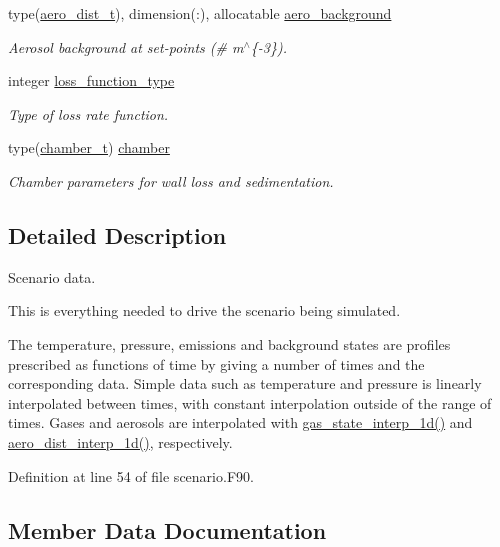 \begin{DoxyCompactItemize}
type(\mbox{\hyperlink{structpmc__aero__dist_1_1aero__dist__t}{aero\+\_\+dist\+\_\+t}}), dimension(\+:), allocatable \mbox{\hyperlink{structpmc__scenario_1_1scenario__t_a3baa3f5d6161da8ee9f83f60778b8aea}{aero\+\_\+background}}
\begin{DoxyCompactList}\small\item\em Aerosol background at set-\/points (\# m$^\wedge$\{-\/3\}). \end{DoxyCompactList}\item 
integer \mbox{\hyperlink{structpmc__scenario_1_1scenario__t_ab57088939db462aeff72b59134fe605e}{loss\+\_\+function\+\_\+type}}
\begin{DoxyCompactList}\small\item\em Type of loss rate function. \end{DoxyCompactList}\item 
type(\mbox{\hyperlink{structpmc__chamber_1_1chamber__t}{chamber\+\_\+t}}) \mbox{\hyperlink{structpmc__scenario_1_1scenario__t_a7913079fb54eeeca7d4e75ca5f9b6185}{chamber}}
\begin{DoxyCompactList}\small\item\em Chamber parameters for wall loss and sedimentation. \end{DoxyCompactList}\end{DoxyCompactItemize}


\subsection{Detailed Description}
Scenario data. 

This is everything needed to drive the scenario being simulated.

The temperature, pressure, emissions and background states are profiles prescribed as functions of time by giving a number of times and the corresponding data. Simple data such as temperature and pressure is linearly interpolated between times, with constant interpolation outside of the range of times. Gases and aerosols are interpolated with \mbox{\hyperlink{namespacepmc__gas__state_ab70d882ec5ebc99127b4e815278cb15a}{gas\+\_\+state\+\_\+interp\+\_\+1d()}} and \mbox{\hyperlink{namespacepmc__aero__dist_a1fe0b780b71145acb4892b597f9218a5}{aero\+\_\+dist\+\_\+interp\+\_\+1d()}}, respectively. 

Definition at line 54 of file scenario.\+F90.



\subsection{Member Data Documentation}
\mbox{\label{structpmc__scenario_1_1scenario__t_a3baa3f5d6161da8ee9f83f60778b8aea}} 

